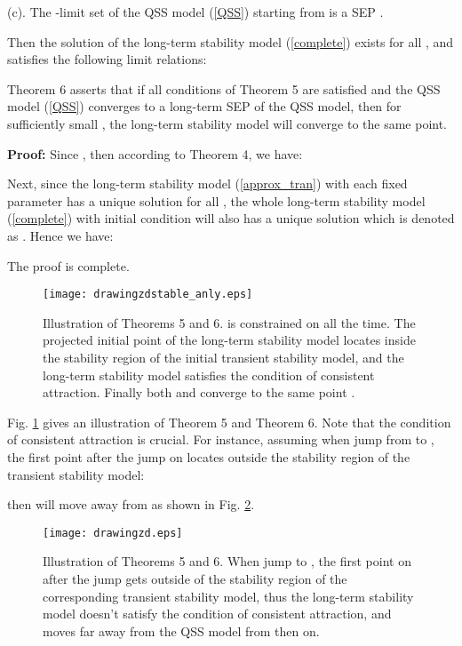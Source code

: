 \documentclass[journal]{IEEEtran}
\begin{document}
(c). The -limit set of the QSS model (\ref{QSS}) starting from  is a SEP .

Then the solution  of the long-term stability model (\ref{complete}) exists for all , and satisfies the following limit relations:


Theorem 6 asserts that if all conditions of Theorem 5 are satisfied and the QSS model (\ref{QSS}) converges to a long-term SEP of the QSS model, then for sufficiently small , the long-term stability model will converge to the same point.

\noindent\textbf{Proof:}
Since , then according to Theorem 4, we have:


Next, since the long-term stability model (\ref{approx_tran}) with each fixed parameter  has a unique solution for all , the whole long-term stability model (\ref{complete}) with initial condition  will also has a unique solution which is denoted as . Hence we have:


The proof is complete.

\begin{figure}[!ht]
\centering
\texttt{[image: drawingzdstable\_anly.eps]}\caption{Illustration of Theorems 5 and 6.  is constrained on  all the time. The projected initial point of the long-term stability model locates inside the stability region of the initial transient stability model, and the long-term stability model satisfies the condition of consistent attraction. Finally both  and  converge to the same point . }\label{QSSstable}
\end{figure}

Fig. \ref{QSSstable} gives an illustration of Theorem 5 and Theorem 6. Note that the condition of consistent attraction is crucial. For instance, assuming when  jump from  to , the first point after the jump  on  locates outside the stability region  of the transient stability model:

then  will move away from  as shown in Fig. \ref{QSSzdunstable}.
\begin{figure}[!ht]
\centering
\texttt{[image: drawingzd.eps]}\caption{Illustration of Theorems 5 and 6. When  jump to , the first point on  after the jump gets outside of the stability region of the corresponding transient stability model, thus the long-term stability model doesn't satisfy the condition of consistent attraction, and  moves far away from the QSS model from then on.}\label{QSSzdunstable}
\end{figure}
\end{document}
